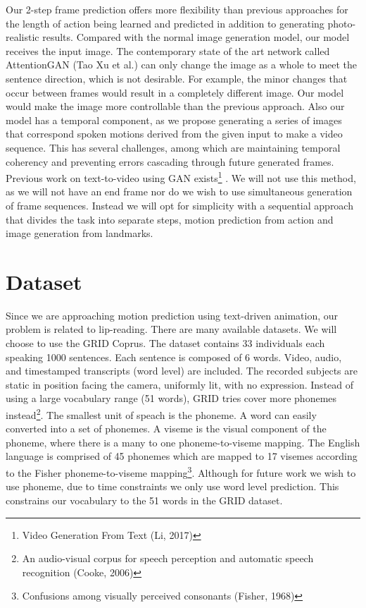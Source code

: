 \documentclass[10pt,twocolumn,letterpaper]{article}
\begin{document}
 Our 2-step frame prediction offers more flexibility than previous approaches for the length of action being learned and predicted in addition to generating photo-realistic results. Compared with the normal image generation model, our model receives the input image. The contemporary state of the art network called AttentionGAN (Tao Xu et al.) can only change the image as a whole to meet the sentence direction, which is not desirable. For example, the minor changes that occur between frames would result in a completely different image. Our model would make the image more controllable than the previous approach. Also our model has a temporal component, as we propose generating a series of images that correspond spoken motions derived from the given input to make a video sequence. This has several challenges, among which are maintaining temporal coherency and preventing errors cascading through future generated frames. Previous work on text-to-video using GAN exists\footnote{Video Generation From Text (Li, 2017)} \cite{Authors15a,Authors15b}. We will not use this method, as we will not have an end frame nor do we wish to use simultaneous generation of frame sequences. Instead we will opt for simplicity with a sequential approach that divides the task into separate steps, motion prediction from action and image generation from landmarks.


\section{Dataset}
 Since we are approaching motion prediction using text-driven animation, our problem is related to lip-reading. There are many available datasets. We will choose to use the GRID Coprus. The dataset contains 33 individuals each speaking 1000 sentences. Each sentence is composed of 6 words. Video, audio, and timestamped transcripts (word level) are included. The recorded subjects are static in position facing the camera, uniformly lit, with no expression. Instead of using a large vocabulary range (51 words), GRID tries cover more phonemes instead\footnote{An audio-visual corpus for speech perception and automatic speech recognition (Cooke, 2006)}. The smallest unit of speach is the phoneme. A word can easily converted into a set of phonemes. A viseme is the visual component  of the phoneme, where there is a many to one phoneme-to-viseme mapping. The English language is comprised of 45 phonemes which are mapped to 17 visemes according to the Fisher phoneme-to-viseme mapping\footnote{Confusions among visually perceived consonants (Fisher, 1968)}. Although for future work we wish to use phoneme, due to time constraints we only use word level prediction. This constrains our vocabulary to the 51 words in the GRID dataset.
\end{document}
